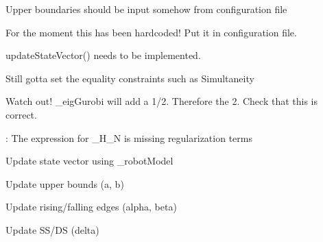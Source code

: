 
\begin{DoxyRefList}
\item[\label{todo__todo000003}%
\hypertarget{todo__todo000003}{}%
\-Member \hyperlink{classConstancy_ae38922343ad8a98bd4e501e8ada5c83c}{\-Constancy\-:\-:\-Constancy} ()]\-Upper boundaries should be input somehow from configuration file  
\item[\label{todo__todo000008}%
\hypertarget{todo__todo000008}{}%
\-Member \hyperlink{classMIQPController_ada92fc35065a11b889019f2948c1888d}{\-M\-I\-Q\-P\-Controller\-:\-:\-\_\-\-Sw} ]\-For the moment this has been hardcoded! \-Put it in configuration file.  
\item[\label{todo__todo000006}%
\hypertarget{todo__todo000006}{}%
\-Member \hyperlink{classMIQPController_aa8fd8452a14d8e7731bf45044e1c7a59}{\-M\-I\-Q\-P\-Controller\-:\-:run} ()]update\-State\-Vector() needs to be implemented. 

\-Still gotta set the equality constraints such as \-Simultaneity 

\-Watch out! \-\_\-eig\-Gurobi will add a 1/2. \-Therefore the 2. \-Check that this is correct. 

\-: \-The expression for \-\_\-\-H\-\_\-\-N is missing regularization terms  
\item[\label{todo__todo000007}%
\hypertarget{todo__todo000007}{}%
\-Member \hyperlink{classMIQPController_a8320465a1ec80d0cf7ba0d17652feba5}{\-M\-I\-Q\-P\-Controller\-:\-:update\-State\-Vector} ()]\-Update state vector using \-\_\-robot\-Model 

\-Update upper bounds (a, b) 

\-Update rising/falling edges (alpha, beta) 

\-Update \-S\-S/\-D\-S (delta) 


\end{DoxyRefList}
